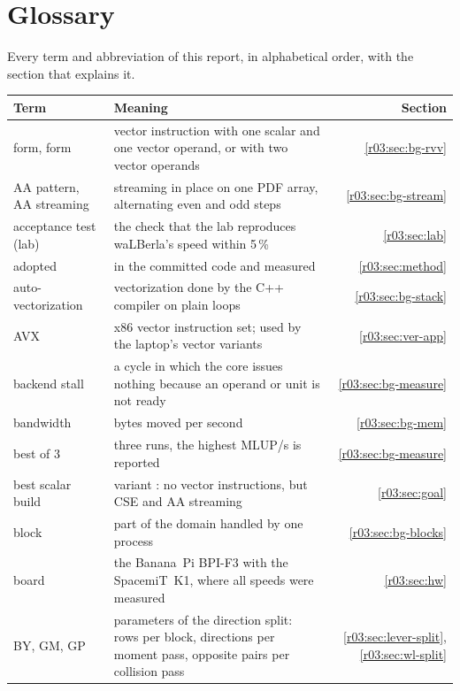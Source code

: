 \chapter{Glossary}\label{r03:app:glossary}

Every term and abbreviation of this report, in alphabetical order, with the section that
explains it.

\begin{xltabular}{\linewidth}{@{}>{\raggedright\arraybackslash}p{3.6cm}>{\raggedright\arraybackslash}Xr@{}}
  \toprule
  \textbf{Term} & \textbf{Meaning} & \textbf{Section}\\
  \midrule
  \endhead
   form,  form & vector instruction with one scalar and one vector operand, or with two
    vector operands & \ref{r03:sec:bg-rvv}\\
  AA pattern, AA streaming & streaming in place on one PDF array, alternating even and odd steps &
    \ref{r03:sec:bg-stream}\\
  acceptance test (lab) & the check that the lab reproduces waLBerla's speed within 5\,\% &
    \ref{r03:sec:lab}\\
  adopted & in the committed code and measured & \ref{r03:sec:method}\\
  auto-vectorization & vectorization done by the C++ compiler on plain loops &
    \ref{r03:sec:bg-stack}\\
  AVX & x86 vector instruction set; used by the laptop's vector variants & \ref{r03:sec:ver-app}\\
  backend stall & a cycle in which the core issues nothing because an operand or unit is not
    ready & \ref{r03:sec:bg-measure}\\
  bandwidth & bytes moved per second & \ref{r03:sec:bg-mem}\\
  best of 3 & three runs, the highest MLUP/s is reported & \ref{r03:sec:bg-measure}\\
  best scalar build & variant : no vector instructions, but CSE and AA
    streaming & \ref{r03:sec:goal}\\
  block & part of the domain handled by one process & \ref{r03:sec:bg-blocks}\\
  board & the Banana~Pi BPI-F3 with the SpacemiT~K1, where all speeds were measured &
    \ref{r03:sec:hw}\\
  BY, GM, GP & parameters of the direction split: rows per block, directions per moment pass,
    opposite pairs per collision pass & \ref{r03:sec:lever-split}, \ref{r03:sec:wl-split}\\

\end{xltabular}
